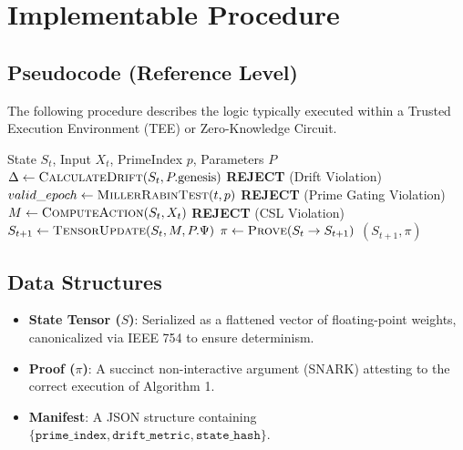 \documentclass[11pt, a4paper]{article}
\begin{document}
\section{Implementable Procedure}

\subsection{Pseudocode (Reference Level)}
The following procedure describes the logic typically executed within a Trusted Execution Environment (TEE) or Zero-Knowledge Circuit.

\begin{algorithm}[H]
\caption{PIRTM\_Core\_Update}
\begin{algorithmic}[1]
\Require State $S_t$, Input $X_t$, PrimeIndex $p$, Parameters $P$
\State $\Delta \gets \textsc{CalculateDrift}(S_t, P.\text{genesis})$
    \State \Return \textbf{REJECT} (Drift Violation)
\EndIf
\State $valid\_epoch \gets \textsc{MillerRabinTest}(t, p)$
    \State \Return \textbf{REJECT} (Prime Gating Violation)
\EndIf
\State $M \gets \textsc{ComputeAction}(S_t, X_t)$
    \State \Return \textbf{REJECT} (CSL Violation)
\EndIf
\State $S_{t+1} \gets \textsc{TensorUpdate}(S_t, M, P.\Psi)$
\State $\pi \gets \textsc{Prove}(S_{t} \to S_{t+1})$ 
\State \Return $(S_{t+1}, \pi)$
\end{algorithmic}
\end{algorithm}

\subsection{Data Structures}
\begin{itemize}
    \item \textbf{State Tensor ($S$)}: Serialized as a flattened vector of floating-point weights, canonicalized via IEEE 754 to ensure determinism.
    \item \textbf{Proof ($\pi$)}: A succinct non-interactive argument (SNARK) attesting to the correct execution of Algorithm 1.
    \item \textbf{Manifest}: A JSON structure containing $\{ \texttt{prime\_index}, \texttt{drift\_metric}, \texttt{state\_hash} \}$.
\end{itemize}
\end{document}
